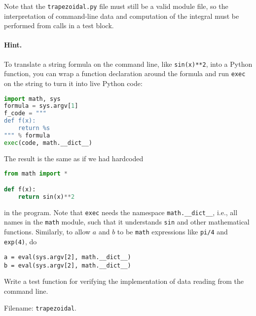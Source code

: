 \documentclass[graybox,sectrefs,envcountresetchap,open=right,final]{svmonodo}
\newenvironment{doconceexercise}{}{}
\begin{document}
\begin{doconceexercise}
Note that the \texttt{trapezoidal.py} file must still be a valid module file, so the
interpretation of command-line data and computation of the integral
must be performed from calls in a test block.


\paragraph{Hint.}
To translate a string formula on the command line, like \texttt{sin(x)**2},
into a Python function, you can wrap a function declaration around
the formula and run \texttt{exec} on the string to turn it into live Python code:

\begin{lstlisting}[language=Python,style=blue1_bluegreen]
import math, sys
formula = sys.argv[1]
f_code = """
def f(x):
    return %s
""" % formula
exec(code, math.__dict__)
\end{lstlisting}
The result is the same as if we had hardcoded

\begin{lstlisting}[language=Python,style=blue1_bluegreen]
from math import *

def f(x):
    return sin(x)**2
\end{lstlisting}
in the program. Note that \texttt{exec} needs the namespace
\Verb!math.__dict__!, i.e., all names in the \texttt{math} module, such that
it understands \texttt{sin} and other mathematical functions.
Similarly, to allow $a$ and $b$ to be \texttt{math} expressions like \texttt{pi/4}
and \texttt{exp(4)}, do

\begin{Verbatim}[frame=lines,label=\fbox{{\tiny Terminal}},framesep=2.5mm,framerule=0.7pt,fontsize=\fontsize{9pt}{9pt}]
a = eval(sys.argv[2], math.__dict__)
b = eval(sys.argv[2], math.__dict__)
\end{Verbatim}


Write a test function for verifying the implementation of
data reading from the command line.

\noindent Filename: \texttt{trapezoidal}.

\end{doconceexercise}
\end{document}
